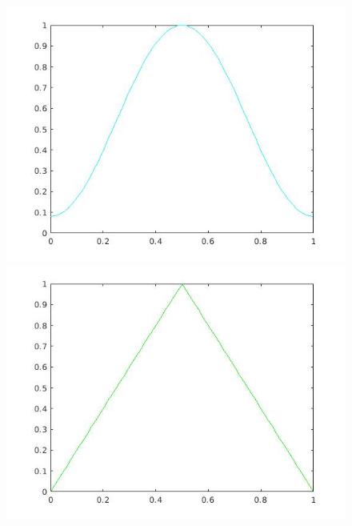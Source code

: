 \documentclass[a4paper,11pt]{article}
\begin{document}
\begin{figure}[!hp]
\centering
\begin{minipage}{.5\textwidth}
  \centering
  \includegraphics[width=1\linewidth]{images/lab2_3.jpg}
\end{minipage}%
\begin{minipage}{.5\textwidth}
  \centering
  \includegraphics[width=1\linewidth]{images/lab2_4.jpg}
\end{minipage}
\end{figure}
\end{document}
